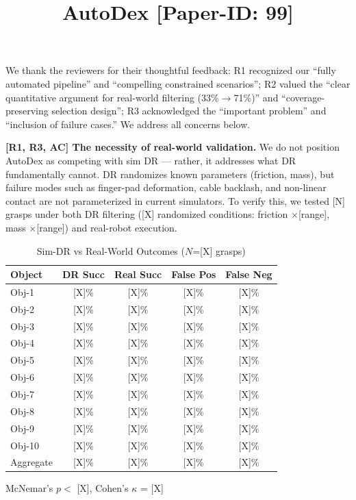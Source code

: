 \documentclass[conference]{IEEEtran}
\newcommand{\rone}{{\color{R1}R1}}
\newcommand{\rthree}{{\color{R3}R3}}
\newcommand{\acmark}{{\color{AC}AC}}
\newcommand{\rssparagraph}[1]{{\bf #1.}}
\begin{document}
\title{AutoDex [Paper-ID: 99]\vspace{-1cm}}
\maketitle
\thispagestyle{empty}

We thank the reviewers for their thoughtful feedback:
{\color{R1}R1} recognized our ``fully automated pipeline'' and ``compelling constrained scenarios'';
{\color{R2}R2} valued the ``clear quantitative argument for real-world filtering (33\%$\to$71\%)'' and ``coverage-preserving selection design'';
{\color{R3}R3} acknowledged the ``important problem'' and ``inclusion of failure cases.''
We address all concerns below.

\rssparagraph{[\rone, \rthree, \acmark] The necessity of real-world validation}
We do not position AutoDex as competing with sim DR --- rather, it addresses what DR fundamentally cannot. DR randomizes known parameters (friction, mass), but failure modes such as finger-pad deformation, cable backlash, and non-linear contact are not parameterized in current simulators.
To verify this, we tested [N] grasps under both DR filtering ([X] randomized conditions: friction $\times$[range], mass $\times$[range]) and real-robot execution.

\begin{table}[h]
\centering
\small
\caption{Sim-DR vs Real-World Outcomes ($N$=[X] grasps)}
\label{tab:dr_vs_real}
\begin{tabular}{l|cccc}
\toprule
\textbf{Object} & \textbf{DR Succ} & \textbf{Real Succ} & \textbf{False Pos} & \textbf{False Neg} \\ \midrule
Obj-1  & {[X]}\% & {[X]}\% & {[X]}\% & {[X]}\% \\
Obj-2  & {[X]}\% & {[X]}\% & {[X]}\% & {[X]}\% \\
Obj-3  & {[X]}\% & {[X]}\% & {[X]}\% & {[X]}\% \\
Obj-4  & {[X]}\% & {[X]}\% & {[X]}\% & {[X]}\% \\
Obj-5  & {[X]}\% & {[X]}\% & {[X]}\% & {[X]}\% \\
Obj-6  & {[X]}\% & {[X]}\% & {[X]}\% & {[X]}\% \\
Obj-7  & {[X]}\% & {[X]}\% & {[X]}\% & {[X]}\% \\
Obj-8  & {[X]}\% & {[X]}\% & {[X]}\% & {[X]}\% \\
Obj-9  & {[X]}\% & {[X]}\% & {[X]}\% & {[X]}\% \\
Obj-10 & {[X]}\% & {[X]}\% & {[X]}\% & {[X]}\% \\
\midrule
Aggregate & {[X]}\% & {[X]}\% & {[X]}\% & {[X]}\% \\
\bottomrule
\end{tabular}

{\small McNemar's $p < $ {[X]}, Cohen's $\kappa$ = {[X]}}
\end{table}
\end{document}
